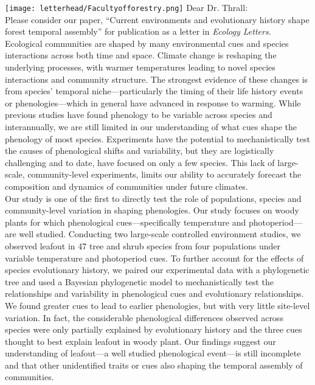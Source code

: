 \documentclass[11pt,a4paper]{article}
\begin{document}

\noindent \texttt{[image: letterhead/Facultyofforestry.png]}
\noindent Dear Dr. Thrall:
\vspace{1.5ex}\\
\noindent Please consider our paper, ``Current environments and evolutionary history shape forest temporal assembly'' for publication as a letter in \emph{Ecology Letters}. 
\vspace{1.5ex}\\ 
Ecological communities are shaped by many environmental cues and species interactions across both time and space. Climate change is reshaping the underlying processes, with warmer temperatures leading to novel species interactions and community structure. The strongest evidence of these changes is from species' temporal niche---particularly the timing of their life history events or phenologies---which in general have advanced in response to warming. While previous studies have found phenology to be variable across species and interannually, we are still limited in our understanding of what cues shape the phenology of most species. Experiments have the potential to mechanistically test the causes of phenological shifts and variability, but they are logistically challenging and to date, have focused on only a few species. This lack of large-scale, community-level experiments, limits our ability to accurately forecast the composition and dynamics of communities under future climates.
\vspace{1.5ex}\\
\noindent 
Our study is one of the first to directly test the role of populations, species and community-level variation in shaping phenologies. Our study focuses on woody plants for which phenological cues---specifically temperature and photoperiod---are well studied. Conducting two large-scale controlled environment studies, we observed leafout in 47 tree and shrub species from four populations under variable temperature and photoperiod cues. To further account for the effects of species evolutionary history, we paired our experimental data with a phylogenetic tree and used a Bayesian phylogenetic model to mechanistically test the relationships and variability in phenological cues and evolutionary relationships.
\vspace{1.5ex}\\
\noindent  
We found greater cues to lead to earlier phenologies, but with very little site-level variation. In fact, the considerable phenological differences observed across species were only partially explained by evolutionary history and the three cues thought to best explain leafout in woody plant. Our findings suggest our understanding of leafout---a well studied phenological event---is still incomplete and that other unidentified traits or cues also shaping the temporal assembly of communities. 
\end{document}
